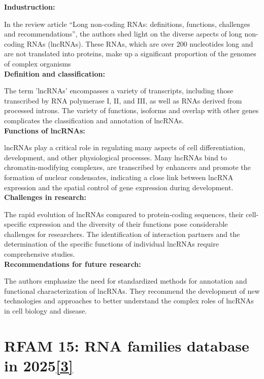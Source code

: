 \documentclass{article}
\begin{document}
\begin{large}
\begin{large}
\begin{large}
\textbf{Industruction:}\par
In the review article “Long non-coding RNAs: definitions, functions, challenges and recommendations”, the authors shed light on the diverse aspects of long non-coding RNAs (lncRNAs). These RNAs, which are over 200 nucleotides long and are not translated into proteins, make up a significant proportion of the genomes of complex organisms\\[0.5em]

\textbf{Definition and classification:}\par
The term 'lncRNAs' encompasses a variety of transcripts, including those transcribed by RNA polymerase I, II, and III, as well as RNAs derived from processed introns. The variety of functions, isoforms and overlap with other genes complicates the classification and annotation of lncRNAs.\\[0.5em]

\textbf{Functions of lncRNAs:}\par
lncRNAs play a critical role in regulating many aspects of cell differentiation, development, and other physiological processes. Many lncRNAs bind to chromatin-modifying complexes, are transcribed by enhancers and promote the formation of nuclear condensates, indicating a close link between lncRNA expression and the spatial control of gene expression during development.\\[0.5em]

\textbf{Challenges in research:}\par
The rapid evolution of lncRNAs compared to protein-coding sequences, their cell-specific expression and the diversity of their functions pose considerable challenges for researchers. The identification of interaction partners and the determination of the specific functions of individual lncRNAs require comprehensive studies.\\[0.5em]

\textbf{Recommendations for future research:}\par
The authors emphasize the need for standardized methods for annotation and functional characterization of lncRNAs. They recommend the development of new technologies and approaches to better understand the complex roles of lncRNAs in cell biology and disease.\\[0.5em]

\clearpage

\section{RFAM 15: RNA families database in 2025\href{https://pubmed.ncbi.nlm.nih.gov/39526405/}{\textbf{[3]}}}


\end{large}
\end{large}
\end{large}
\end{document}
